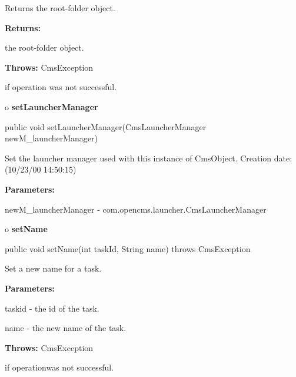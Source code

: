 \begin{description}
\htmlDD Returns the root-folder object. 

\begin{description}
\item {\bf Returns:}  

the root-folder object.  
\item {\bf Throws:} CmsException  

if operation was not successful.  
\end{description}

\end{description}

o {\bf setLauncherManager} 

\begin{PRE}
 public void setLauncherManager(CmsLauncherManager newM\_launcherManager)
\end{PRE}

\begin{description}
\htmlDD Set the launcher manager used with this instance of CmsObject.
Creation date: (10/23/00 14:50:15) 

\begin{description}
\item {\bf Parameters:}  

newM\_launcherManager - com.opencms.launcher.CmsLauncherManager  
\end{description}

\end{description}

o {\bf setName} 

\begin{PRE}
 public void setName(int taskId,
                     String name) throws CmsException
\end{PRE}

\begin{description}
\htmlDD Set a new name for a task. 

\begin{description}
\item {\bf Parameters:}  

taskid - the id of the task.  

name - the new name of the task.  
\item {\bf Throws:} CmsException  

if operationwas not successful.  
\end{description}

\end{description}

